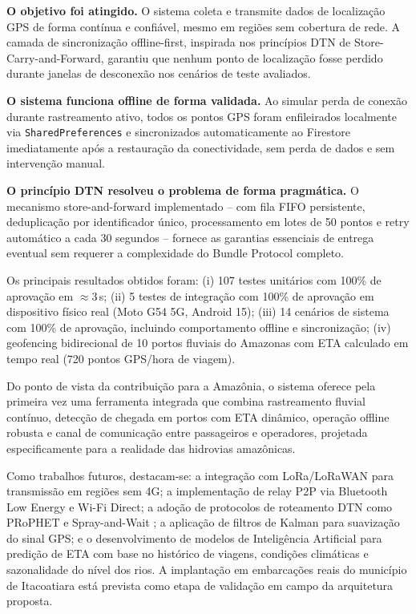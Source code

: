 \documentclass[12pt]{article}
\begin{document}
\textbf{O objetivo foi atingido.} O sistema coleta e transmite dados de localização GPS de forma contínua e confiável, mesmo em regiões sem cobertura de rede. A camada de sincronização offline-first, inspirada nos princípios DTN de Store-Carry-and-Forward, garantiu que nenhum ponto de localização fosse perdido durante janelas de desconexão nos cenários de teste avaliados.

\textbf{O sistema funciona offline de forma validada.} Ao simular perda de conexão durante rastreamento ativo, todos os pontos GPS foram enfileirados localmente via \texttt{SharedPreferences} e sincronizados automaticamente ao Firestore imediatamente após a restauração da conectividade, sem perda de dados e sem intervenção manual.

\textbf{O princípio DTN resolveu o problema de forma pragmática.} O mecanismo store-and-forward implementado -- com fila FIFO persistente, deduplicação por identificador único, processamento em lotes de 50 pontos e retry automático a cada 30 segundos -- fornece as garantias essenciais de entrega eventual sem requerer a complexidade do Bundle Protocol completo.

Os principais resultados obtidos foram: (i) 107 testes unitários com 100\% de aprovação em $\approx$3\,s; (ii) 5 testes de integração com 100\% de aprovação em dispositivo físico real (Moto G54 5G, Android 15); (iii) 14 cenários de sistema com 100\% de aprovação, incluindo comportamento offline e sincronização; (iv) geofencing bidirecional de 10 portos fluviais do Amazonas com ETA calculado em tempo real (720 pontos GPS/hora de viagem).

Do ponto de vista da contribuição para a Amazônia, o sistema oferece pela primeira vez uma ferramenta integrada que combina rastreamento fluvial contínuo, detecção de chegada em portos com ETA dinâmico, operação offline robusta e canal de comunicação entre passageiros e operadores, projetada especificamente para a realidade das hidrovias amazônicas.

Como trabalhos futuros, destacam-se: a integração com LoRa/LoRaWAN para transmissão em regiões sem 4G; a implementação de relay P2P via Bluetooth Low Energy e Wi-Fi Direct; a adoção de protocolos de roteamento DTN como PRoPHET \cite{lindgren2003prophet} e Spray-and-Wait \cite{spyropoulos2005spray}; a aplicação de filtros de Kalman para suavização do sinal GPS; e o desenvolvimento de modelos de Inteligência Artificial para predição de ETA com base no histórico de viagens, condições climáticas e sazonalidade do nível dos rios. A implantação em embarcações reais do município de Itacoatiara está prevista como etapa de validação em campo da arquitetura proposta.



\end{document}
